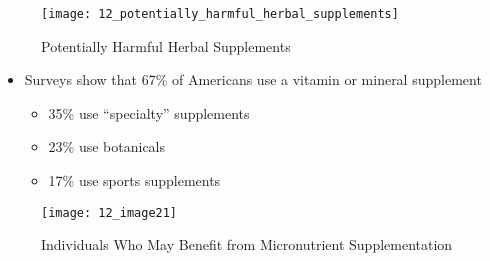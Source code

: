 \documentclass[title={Chapter 12}]{fdsn201notes}
\begin{document}
\begin{figure}[H]
	\centering
	\texttt{[image: 12\_potentially\_harmful\_herbal\_supplements]}
	\caption{Potentially Harmful Herbal Supplements}
	\label{fig:12-potentially-armful-erbal-supplements}
\end{figure}

\begin{itemize}
	\item Surveys show that 67\% of Americans use a vitamin or mineral supplement
	\begin{itemize}
		\item 35\% use “specialty” supplements
		\item 23\% use botanicals
		\item 17\% use sports supplements
	\end{itemize}
\end{itemize}

\begin{figure}[H]
	\centering
	\texttt{[image: 12\_image21]}
	\caption{Individuals Who May Benefit from Micronutrient Supplementation}
	\label{fig:micronutrient-supplementation}
\end{figure}
\end{document}
